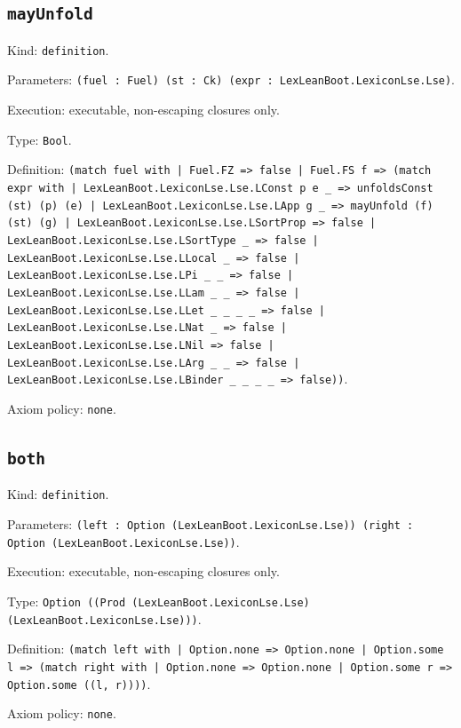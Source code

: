 \documentclass[11pt]{article}
\begin{document}
\subsection*{\texttt{mayUnfold}}
\noindent Kind: \texttt{definition}.\par
\noindent Parameters: \texttt{(fuel : Fuel) (st : Ck) (expr : LexLeanBoot.LexiconLse.Lse)}.\par
\noindent Execution: executable, non-escaping closures only.\par
\noindent Type: \texttt{Bool}.\par
\noindent Definition: \texttt{(match fuel with | Fuel.FZ => false | Fuel.FS f => (match expr with | LexLeanBoot.LexiconLse.Lse.LConst p e \_ => unfoldsConst (st) (p) (e) | LexLeanBoot.LexiconLse.Lse.LApp g \_ => mayUnfold (f) (st) (g) | LexLeanBoot.LexiconLse.Lse.LSortProp => false | LexLeanBoot.LexiconLse.Lse.LSortType \_ => false | LexLeanBoot.LexiconLse.Lse.LLocal \_ => false | LexLeanBoot.LexiconLse.Lse.LPi \_ \_ => false | LexLeanBoot.LexiconLse.Lse.LLam \_ \_ => false | LexLeanBoot.LexiconLse.Lse.LLet \_ \_ \_ \_ => false | LexLeanBoot.LexiconLse.Lse.LNat \_ => false | LexLeanBoot.LexiconLse.Lse.LNil => false | LexLeanBoot.LexiconLse.Lse.LArg \_ \_ => false | LexLeanBoot.LexiconLse.Lse.LBinder \_ \_ \_ \_ => false))}.\par
\noindent Axiom policy: \texttt{none}.\par
\subsection*{\texttt{both}}
\noindent Kind: \texttt{definition}.\par
\noindent Parameters: \texttt{(left : Option (LexLeanBoot.LexiconLse.Lse)) (right : Option (LexLeanBoot.LexiconLse.Lse))}.\par
\noindent Execution: executable, non-escaping closures only.\par
\noindent Type: \texttt{Option ((Prod (LexLeanBoot.LexiconLse.Lse) (LexLeanBoot.LexiconLse.Lse)))}.\par
\noindent Definition: \texttt{(match left with | Option.none => Option.none | Option.some l => (match right with | Option.none => Option.none | Option.some r => Option.some ((l, r))))}.\par
\noindent Axiom policy: \texttt{none}.\par
\end{document}
